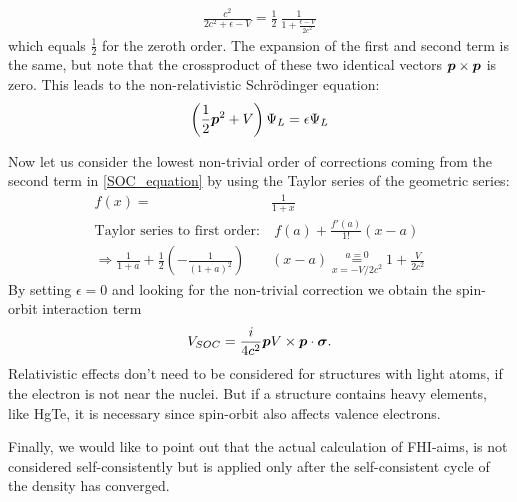 	\begin{align}
		\frac{c^2}{2c^2 + \epsilon -V} = 
		\frac{1}{2}~ \frac{1}{1 + \frac{\epsilon-V}{2c^2}} 
	\end{align}
	which equals $\frac{1}{2}$ for the zeroth order. The expansion of the first and second term is the same, but note that the crossproduct of these two identical vectors $\boldsymbol{p} \times \boldsymbol{p}$ is zero.
	This leads to the non-relativistic Schrödinger equation:
	\begin{align}
		\left(
		\frac{1}{2} \boldsymbol{p}^2 + V 
		\right)\Psi_L
		= \epsilon \Psi_L
	\end{align}

	Now let us consider the lowest non-trivial order of corrections coming from the second term in \eqref{SOC_equation} by using the Taylor series of the geometric series:
	\begin{align}
		f(x)=& \frac{1}{1+x} \\
		\text{Taylor series to first order:}& ~f(a) + \frac{f'(a)}{1!} (x-a)  \\
		\Rightarrow
		\frac{1}{1+a} + \frac{1}{2}
		\left(
			- \frac{1}{(1+a)^2}	
		\right)&
		(x - a) 
		\overset{a=0}{\underset{x=-V/2c^2}{=}}		
		1 + \frac{V}{2c^2}
	\end{align} 
	By setting $\epsilon=0$ and looking for the non-trivial correction we obtain the spin-orbit interaction term  
	\begin{align}
		V_{SOC} = \frac{i}{4c^2} \boldsymbol{p} V \times \boldsymbol{p} \cdot \boldsymbol{\sigma}.
	\end{align}
	Relativistic effects don't need to be considered for structures with light atoms, if the electron is not near the nuclei. But if a structure contains heavy elements, like HgTe, it is necessary since spin-orbit also affects valence electrons.

	Finally, we would like to point out that the actual calculation of FHI-aims, 
	is not considered self-consistently but is applied only after the self-consistent cycle of the density has converged.

